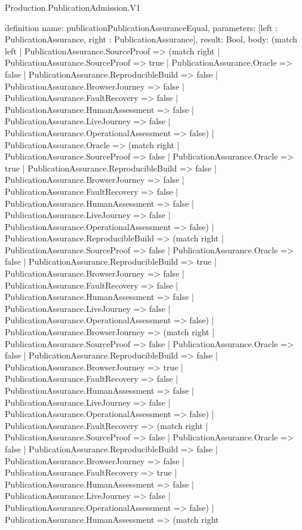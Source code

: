 \begin{lexlean}{Production.PublicationAdmission.V1}
\begin{semanticmodule}
definition{
  name: publicationPublicationAssuranceEqual,
  parameters: [left : PublicationAssurance, right : PublicationAssurance],
  result: Bool,
  body: (match left
    | PublicationAssurance.SourceProof => (match right
      | PublicationAssurance.SourceProof => true
      | PublicationAssurance.Oracle => false
      | PublicationAssurance.ReproducibleBuild => false
      | PublicationAssurance.BrowserJourney => false
      | PublicationAssurance.FaultRecovery => false
      | PublicationAssurance.HumanAssessment => false
      | PublicationAssurance.LiveJourney => false
      | PublicationAssurance.OperationalAssessment => false)
    | PublicationAssurance.Oracle => (match right
      | PublicationAssurance.SourceProof => false
      | PublicationAssurance.Oracle => true
      | PublicationAssurance.ReproducibleBuild => false
      | PublicationAssurance.BrowserJourney => false
      | PublicationAssurance.FaultRecovery => false
      | PublicationAssurance.HumanAssessment => false
      | PublicationAssurance.LiveJourney => false
      | PublicationAssurance.OperationalAssessment => false)
    | PublicationAssurance.ReproducibleBuild => (match right
      | PublicationAssurance.SourceProof => false
      | PublicationAssurance.Oracle => false
      | PublicationAssurance.ReproducibleBuild => true
      | PublicationAssurance.BrowserJourney => false
      | PublicationAssurance.FaultRecovery => false
      | PublicationAssurance.HumanAssessment => false
      | PublicationAssurance.LiveJourney => false
      | PublicationAssurance.OperationalAssessment => false)
    | PublicationAssurance.BrowserJourney => (match right
      | PublicationAssurance.SourceProof => false
      | PublicationAssurance.Oracle => false
      | PublicationAssurance.ReproducibleBuild => false
      | PublicationAssurance.BrowserJourney => true
      | PublicationAssurance.FaultRecovery => false
      | PublicationAssurance.HumanAssessment => false
      | PublicationAssurance.LiveJourney => false
      | PublicationAssurance.OperationalAssessment => false)
    | PublicationAssurance.FaultRecovery => (match right
      | PublicationAssurance.SourceProof => false
      | PublicationAssurance.Oracle => false
      | PublicationAssurance.ReproducibleBuild => false
      | PublicationAssurance.BrowserJourney => false
      | PublicationAssurance.FaultRecovery => true
      | PublicationAssurance.HumanAssessment => false
      | PublicationAssurance.LiveJourney => false
      | PublicationAssurance.OperationalAssessment => false)
    | PublicationAssurance.HumanAssessment => (match right
}
\end{semanticmodule}
\end{lexlean}
